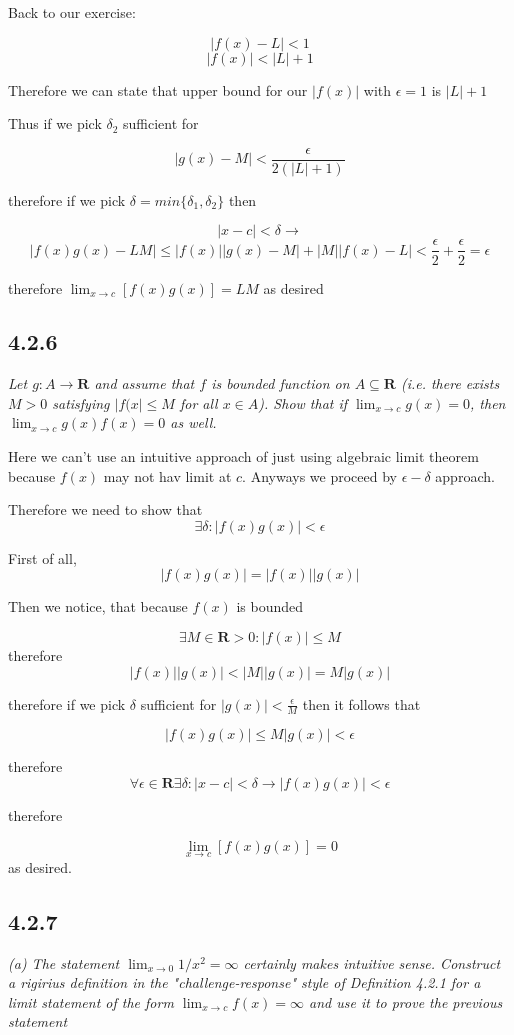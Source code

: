 \documentclass[11pt,oneside,titlepage]{book}
\begin{document}
Back to our exercise: 

$$|f(x) - L| < 1$$
$$|f(x)| < |L| + 1$$

Therefore we can state that upper bound for our $|f(x)|$ with $\epsilon = 1$ is $|L| + 1$

Thus if we pick $\delta_2$ sufficient for

$$|g(x) - M| < \frac{\epsilon}{2(|L| + 1)}$$

therefore if we pick $\delta = min\{\delta_1, \delta_2\}$ then

$$|x - c| < \delta \to $$
$$|f(x)g(x) - LM| \leq |f(x)||g(x) - M| + |M||f(x) - L| <  \frac{\epsilon}{2} +
\frac{\epsilon}{2} = \epsilon  $$

therefore $\lim_{x \to c}[f(x) g(x)] = LM$ as desired

\subsection*{4.2.6}
\textit{Let $g: A\to \textbf{R}$ and assume that $f$ is bounded function on $A \subseteq \textbf{R}$
  (i.e. there exists $M > 0$ satisfying $|f(x| \leq M$ for all $x \in A$). Show that
  if $\lim_{x \to c}g(x) = 0$, then $\lim_{x \to c}g(x)f(x) = 0$ as well.}

Here we can't use an intuitive approach of just using algebraic limit theorem because $f(x)$ may
not hav limit at $c$.
Anyways we proceed by $\epsilon-\delta$ approach.

Therefore we need to show that
$$\exists \delta: |f(x)g(x)| < \epsilon$$

First of all,
$$ |f(x)g(x)| = |f(x)||g(x)|$$

Then we notice, that because $f(x)$ is bounded

$$\exists M \in \textbf{R} > 0: |f(x)| \leq M$$
therefore
$$|f(x)||g(x)| < |M||g(x)| = M|g(x)|$$

therefore if we pick $\delta$ sufficient for $|g(x)| < \frac{\epsilon}{M}$ then it follows that

$$|f(x)g(x)| \leq M|g(x)| < \epsilon$$

therefore
$$\forall \epsilon \in \textbf{R} \exists \delta : |x - c| < \delta \to |f(x)g(x)| < \epsilon$$

therefore

$$\lim_{x \to c}[f(x)g(x)] = 0$$
as desired.

\subsection*{4.2.7}
\textit{(a) The statement $\lim_{x \to 0}1/x^2 = \infty$ certainly makes intuitive sense. Construct a rigirius definition in the "challenge-response" style of Definition 4.2.1 for a limit statement of the form $\lim_{x \to c}f(x) = \infty$ and use it to prove the previous statement }
\end{document}
